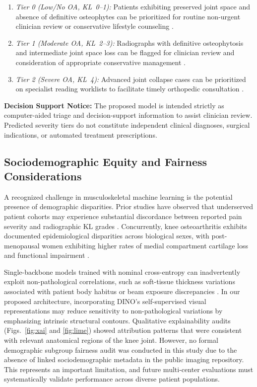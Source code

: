 \documentclass[10pt,journal]{IEEEtran}
\begin{document}
\begin{enumerate}[leftmargin=*]
\item \textit{Tier 0 (Low/No OA, KL~0--1):} Patients exhibiting preserved joint space and absence of definitive osteophytes can be prioritized for routine non-urgent clinician review or conservative lifestyle counseling \cite{zhang2010eular}.
\item \textit{Tier 1 (Moderate OA, KL~2--3):} Radiographs with definitive osteophytosis and intermediate joint space loss can be flagged for clinician review and consideration of appropriate conservative management \cite{zhang2010eular}.
\item \textit{Tier 2 (Severe OA, KL~4):} Advanced joint collapse cases can be prioritized on specialist reading worklists to facilitate timely orthopedic consultation \cite{carr2012knee}.
\end{enumerate}

\noindent\textbf{Decision Support Notice:} The proposed model is intended strictly as computer-aided triage and decision-support information to assist clinician review. Predicted severity tiers do not constitute independent clinical diagnoses, surgical indications, or automated treatment prescriptions.

\subsection{Sociodemographic Equity and Fairness Considerations}
\label{subsec:bias_fairness}

A recognized challenge in musculoskeletal machine learning is the potential presence of demographic disparities. Prior studies have observed that underserved patient cohorts may experience substantial discordance between reported pain severity and radiographic KL grades \cite{pierson2021algorithmic}. Concurrently, knee osteoarthritis exhibits documented epidemiological disparities across biological sexes, with post-menopausal women exhibiting higher rates of medial compartment cartilage loss and functional impairment \cite{hunter2019oa, loeser2012oa}.

Single-backbone models trained with nominal cross-entropy can inadvertently exploit non-pathological correlations, such as soft-tissue thickness variations associated with patient body habitus or beam exposure discrepancies \cite{tajbakhsh2016convolutional}. In our proposed architecture, incorporating DINO's self-supervised visual representations may reduce sensitivity to non-pathological variations by emphasizing intrinsic structural contours. Qualitative explainability audits (Figs.~\ref{fig:xai} and \ref{fig:lime}) showed attribution patterns that were consistent with relevant anatomical regions of the knee joint. However, no formal demographic subgroup fairness audit was conducted in this study due to the absence of linked sociodemographic metadata in the public imaging repository. This represents an important limitation, and future multi-center evaluations must systematically validate performance across diverse patient populations.
\end{document}
